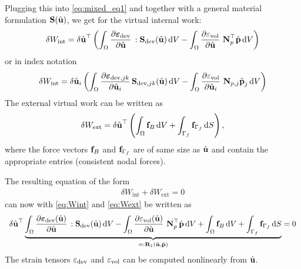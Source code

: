 Plugging this into \eqref{eq:mixed_eq1} and together with a general material formulation $\textbf{S}(\hat{\textbf{u}})$, we get for the virtual internal work:
\begin{equation}\label{eq:Wint}
  \begin{array}{lll}
    \delta W_\text{int} = \delta \hat{\bfu}^\top \left(\ds\int_{\Omega} \p{\bfeps_\text{dev}}{\hat{\bfu}} : \bfS_\text{dev}(\hat{\bfu}) \,\d V - \ds\int_{\Omega} \p{\eps_\text{vol}}{\hat{\bfu}}\,\bfN_p^\top \hat{\bfp} \,\d V\right)
  \end{array}
\end{equation}
or in index notation
\begin{equation*}
  \begin{array}{lll}
    \delta W_\text{int} = \delta\hat{\bfu}_i \left(\ds\int_{\Omega} \p{\bfeps_{\text{dev},jk}}{\hat{\bfu}_i} \bfS_{\text{dev},jk}(\hat{\bfu}) \,\d V - \ds\int_{\Omega} \p{\eps_\text{vol}}{\hat{\bfu}_{i}}\,\bfN_{p,j} \hat{\bfp}_j \,\d V\right)
  \end{array}
\end{equation*}
The external virtual work can be written as
\begin{equation}\label{eq:Wext}
  \begin{array}{lll}
    \delta W_\text{ext} = \delta\hat{\bfu}^\top \left(\ds\int_{\Omega} \bff_{B}\,\d V + \ds\int_{\Gamma_f}  \bff_{\Gamma_f}\,\d S\right),
  \end{array}
\end{equation}
where the force vectors $\textbf{f}_B$ and $\textbf{f}_{\Gamma_f}$ are of same size as $\hat{\textbf{u}}$ and contain the appropriate entries (consistent nodal forces).
 
The resulting equation of the form
\begin{equation*}
  \begin{array}{lll}
    \delta W_\text{int} + \delta W_\text{ext} = 0
  \end{array}
\end{equation*}
can now with \eqref{eq:Wint} and \eqref{eq:Wext} be written as
\begin{equation*}
  \begin{array}{lll}
    \delta\hat{\bfu}^\top \ub{
      \ds\int_{\Omega} \p{\bfeps_\text{dev}(\hat{\bfu})}{\hat{\bfu}} : \bfS_\text{dev}(\hat{\bfu}) \,\d V - \ds\int_{\Omega} \p{\eps_\text{vol}(\hat{\bfu})}{\hat{\bfu}}\, \bfN_p^\top \hat{\bfp} \,\d V 
      + \ds\int_{\Omega} \bff_{B}\,\d V + \ds\int_{\Gamma_f}  \bff_{\Gamma_f}\,\d S 
    }{=:\bfR_1(\hat{\bfu},\hat{\bfp})} = 0
  \end{array}
\end{equation*}
The strain tensors $\varepsilon_\text{dev}$ and $\varepsilon_\text{vol}$ can be computed nonlinearly from $\hat{\textbf{u}}$.

